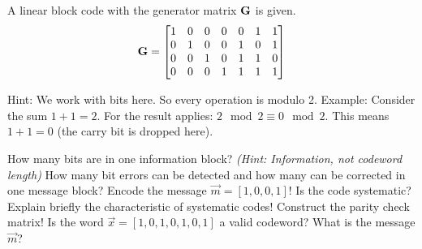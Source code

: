 \begin{question}[subtitle={Channel Coding}]
	A linear block code with the generator matrix $\bm{\mathrm{G}}$ is given.
	\begin{equation*}
		\bm{\mathrm{G}} = \left[\begin{matrix}
			1 & 0 & 0 & 0 & 0 & 1 & 1 \\
			0 & 1 & 0 & 0 & 1 & 0 & 1 \\
			0 & 0 & 1 & 0 & 1 & 1 & 0 \\
			0 & 0 & 0 & 1 & 1 & 1 & 1
		\end{matrix}\right]
	\end{equation*}

	Hint: We work with bits here. So every operation is modulo 2. Example: Consider the sum $1 + 1 = 2$. For the result applies: $2 \mod 2 \equiv 0 \mod 2$. This means $1 + 1 = 0$ (the carry bit is dropped here).
	
	\begin{tasks}
		\task
		How many bits are in one information block? \textit{(Hint: Information, not codeword length)}
		\task
		How many bit errors can be detected and how many can be corrected in one message block?
		\task
		Encode the message $\vec{m} = \left[1, 0, 0, 1\right]$!
		\task
		Is the code systematic? Explain briefly the characteristic of systematic codes!
		\task
		Construct the parity check matrix!
		\task
		Is the word $\vec{x} = \left[1, 0, 1, 0, 1, 0, 1\right]$ a valid codeword? What is the message $\vec{m}$?
	\end{tasks}
\end{question}

